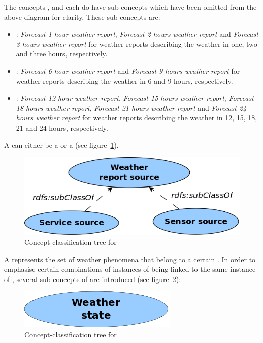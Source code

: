 The concepts ,  and  each do have sub-concepts which have been omitted from the above diagram for clarity. These sub-concepts are:
\begin{itemize}
  \item {}: \emph{Forecast 1 hour weather report}, \emph{Forecast 2 hours weather report} and \emph{Forecast 3 hours weather report} for weather reports describing the weather in one, two and three hours, respectively.
  \item {}: \emph{Forecast 6 hour weather report} and \emph{Forecast 9 hours weather report} for weather reports describing the weather in 6 and 9 hours, respectively.
  \item {}: \emph{Forecast 12 hour weather report}, \emph{Forecast 15 hours weather report}, \emph{Forecast 18 hours weather report}, \emph{Forecast 21 hours weather report} and \emph{Forecast 24 hours weather report} for weather reports describing the weather in 12, 15, 18, 21 and 24 hours, respectively.
\end{itemize}

A  can either be a  or a  (see figure~\ref{fig:tree_weather_source}).

\begin{figure}
  \centering
  \includegraphics[width=.5\textwidth]{figures/diagrams/weather-report-source.png}
  \caption{Concept-classification tree for }
  \label{fig:tree_weather_source}
\end{figure}

A  represents the set of weather phenomena that belong to a certain . In order to emphasise certain combinations of instances of  being linked to the same instance of , several sub-concepts of  are introduced (see figure~\ref{fig:tree_weather_state}): %

\begin{figure}
  \centering
  \includegraphics[width=.3\textwidth]{figures/diagrams/weather-state.png}
  \caption{Concept-classification tree for }
  \label{fig:tree_weather_state}
\end{figure}

